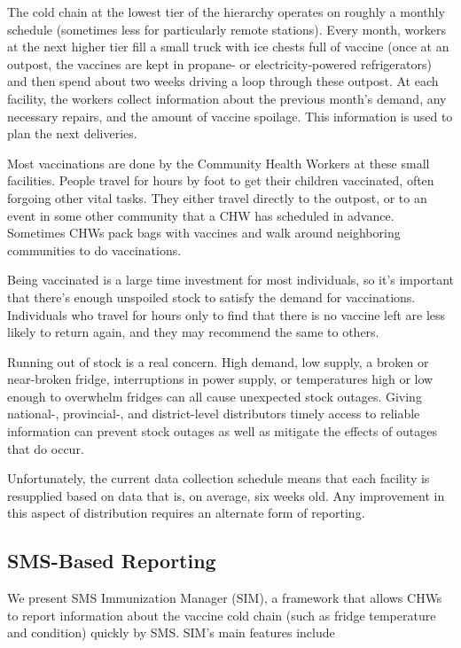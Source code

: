 \documentclass{acm_proc_article-sp}
\begin{document}
The cold chain at the lowest tier of the hierarchy operates on roughly a monthly schedule (sometimes less for particularly remote stations). Every month, workers at the next higher tier fill a small truck with ice chests full of vaccine (once at an outpost, the vaccines are kept in propane- or electricity-powered refrigerators) and then spend about two weeks driving a loop through these outpost. At each facility, the workers collect information about the previous month's demand, any necessary repairs, and the amount of vaccine spoilage. This information is used to plan the next deliveries. 

Most vaccinations are done by the Community Health Workers at these small facilities. People travel for hours by foot to get their children vaccinated, often forgoing other vital tasks. They either travel directly to the outpost, or to an event in some other community that a CHW has scheduled in advance. Sometimes CHWs pack bags with vaccines and walk around neighboring communities to do vaccinations. 

Being vaccinated is a large time investment for most individuals, so it's important that there's enough unspoiled stock to satisfy the demand for vaccinations. Individuals who travel for hours only to find that there is no vaccine left are less likely to return again, and they may recommend the same to others. 

Running out of stock is a real concern. High demand, low supply, a broken or near-broken fridge, interruptions in power supply, or temperatures high or low enough to overwhelm fridges can all cause unexpected stock outages. Giving national-, provincial-, and district-level distributors timely access to reliable information can prevent stock outages as well as mitigate the effects of outages that do occur. 

Unfortunately, the current data collection schedule means that each facility is resupplied based on data that is, on average, six weeks old. Any improvement in this aspect of distribution requires an alternate form of reporting. 

\subsection{SMS-Based Reporting}

We present SMS Immunization Manager (SIM), a framework that allows CHWs to report information about the vaccine cold chain (such as fridge temperature and condition) quickly by SMS. SIM's main features include 
\end{document}
